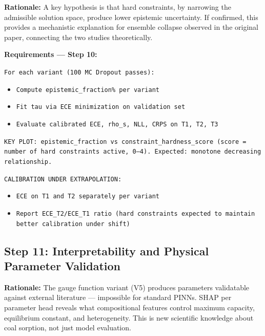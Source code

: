 \documentclass[12pt,a4paper]{article}
\begin{document}
\begin{rationalebox}
\textbf{Rationale:} A key hypothesis is that hard constraints, by narrowing
the admissible solution space, produce lower epistemic uncertainty. If
confirmed, this provides a mechanistic explanation for ensemble collapse
observed in the original paper, connecting the two studies theoretically.
\end{rationalebox}

\begin{promptbox}
\textbf{Requirements --- Step 10:}

\texttt{For each variant (100 MC Dropout passes):}
\begin{itemize}[noitemsep]
  \item \texttt{Compute epistemic\_fraction\% per variant}
  \item \texttt{Fit tau via ECE minimization on validation set}
  \item \texttt{Evaluate calibrated ECE, rho\_s, NLL, CRPS on T1, T2, T3}
\end{itemize}

\texttt{KEY PLOT: epistemic\_fraction vs constraint\_hardness\_score
(score = number of hard constraints active, 0--4).
Expected: monotone decreasing relationship.}

\texttt{CALIBRATION UNDER EXTRAPOLATION:}
\begin{itemize}[noitemsep]
  \item \texttt{ECE on T1 and T2 separately per variant}
  \item \texttt{Report ECE\_T2/ECE\_T1 ratio (hard constraints expected
    to maintain better calibration under shift)}
\end{itemize}
\end{promptbox}

\subsection{Step 11: Interpretability and Physical Parameter Validation}

\begin{rationalebox}
\textbf{Rationale:} The gauge function variant (V5) produces parameters
validatable against external literature --- impossible for standard PINNs.
SHAP per parameter head reveals what compositional features control
maximum capacity, equilibrium constant, and heterogeneity. This is new
scientific knowledge about coal sorption, not just model evaluation.
\end{rationalebox}
\end{document}
